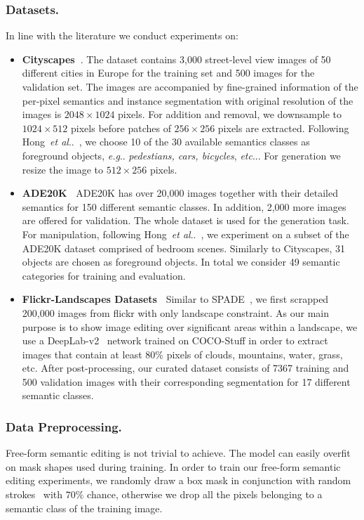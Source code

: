 \documentclass[runningheads]{llncs}
\makeatletter
\DeclareRobustCommand\onedot{\futurelet\@let@token\@onedot}
\def\@onedot{\ifx\@let@token.\else.\null\fi\xspace}
\def\eg{\emph{e.g}\onedot} \def\Eg{\emph{E.g}\onedot}
\def\etc{\emph{etc}\onedot} \def\vs{\emph{vs}\onedot}
\def\etal{\emph{et al}\onedot}
\def\hong{Hong~\etal~\cite{hong2018learning}}
\makeatother
\begin{document}
\subsubsection{Datasets.} In line with the literature we conduct experiments on:
\begin{itemize}
    \item\textbf{Cityscapes~\cite{Cordts_2016_CVPR}}. The dataset contains 3,000 street-level view images of 50 different cities in Europe for the training set and 500 images for the validation set. The images are accompanied by fine-grained information of the per-pixel semantics and instance segmentation with original resolution of the images is $2048\times 1024$ pixels. For addition and removal, we downsample to $1024\times 512$ pixels before patches of $256\times 256$ pixels are extracted.
    Following \hong{}, we choose 10 of the 30 available semantics classes as foreground objects, \eg{} \textit{pedestians, cars, bicycles}, \etc{}.
    For generation we resize the image to $512\times 256$ pixels.


    \item\textbf{ADE20K~\cite{zhou2016semantic,zhou2017scene}}
    \label{ssc:ADE20K}
    ADE20K has over 20,000 images together with their detailed semantics for 150 different semantic classes.
    In addition, 2,000 more images are offered for validation.
    The whole dataset is used for the generation task.
	For manipulation, following Hong~\etal~\cite{hong2018learning}, we experiment on a subset of the ADE20K dataset comprised of bedroom scenes.
	Similarly to Cityscapes, 31 objects are chosen as foreground objects. In total we consider 49 semantic categories for training and evaluation. 

    \item\textbf{Flickr-Landscapes Datasets~\cite{park2019SPADE}}
    \label{ssc:Flickr}
    Similar to SPADE~\cite{park2019SPADE}, we first scrapped 200,000 images from flickr with only landscape constraint. As our main purpose is to show image editing over significant areas within a landscape, we use a DeepLab-v2~\cite{chen2017deeplabv2} network trained on COCO-Stuff in order to extract images that contain at least 80\% pixels of clouds, mountains, water, grass, etc. After post-processing, our curated dataset consists of 7367 training and 500 validation images with their corresponding segmentation for 17 different semantic classes. 
\end{itemize}

\subsubsection{Data Preprocessing.}
Free-form semantic editing is not trivial to achieve.
The model can easily overfit on mask shapes used during training.
In order to train our free-form semantic editing experiments, we randomly draw a box mask in conjunction with random strokes~\cite{yu2018free} with $70\%$ chance, otherwise we drop all the pixels belonging to a semantic class of the training image.
   
\end{document}
